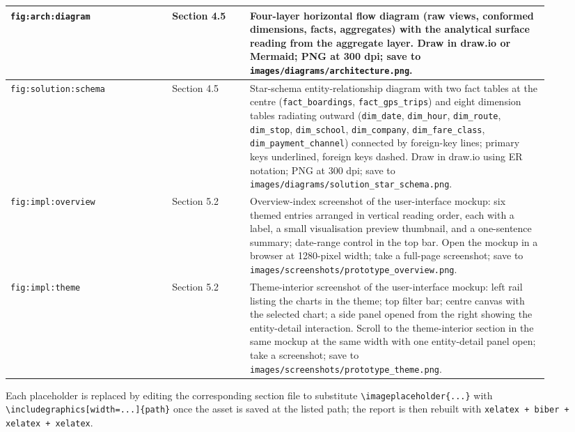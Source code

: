 \begin{longtable}{p{0.27\linewidth} p{0.13\linewidth} p{0.50\linewidth}}
\hline
\texttt{fig:arch:diagram} & Section 4.5 & Four-layer horizontal flow diagram (raw views, conformed dimensions, facts, aggregates) with the analytical surface reading from the aggregate layer. Draw in draw.io or Mermaid; PNG at 300 dpi; save to \texttt{images/diagrams/\linebreak architecture.png}. \\
\hline
\texttt{fig:solution:schema} & Section 4.5 & Star-schema entity-relationship diagram with two fact tables at the centre (\texttt{fact\_boardings}, \texttt{fact\_gps\_trips}) and eight dimension tables radiating outward (\texttt{dim\_date}, \texttt{dim\_hour}, \texttt{dim\_route}, \texttt{dim\_stop}, \texttt{dim\_school}, \texttt{dim\_company}, \texttt{dim\_fare\_class}, \texttt{dim\_payment\_channel}) connected by foreign-key lines; primary keys underlined, foreign keys dashed. Draw in draw.io using ER notation; PNG at 300 dpi; save to \texttt{images/diagrams/\linebreak solution\_star\_schema.png}. \\
\hline
\texttt{fig:impl:overview} & Section 5.2 & Overview-index screenshot of the user-interface mockup: six themed entries arranged in vertical reading order, each with a label, a small visualisation preview thumbnail, and a one-sentence summary; date-range control in the top bar. Open the mockup in a browser at 1280-pixel width; take a full-page screenshot; save to \texttt{images/screenshots/\linebreak prototype\_overview.png}. \\
\hline
\texttt{fig:impl:theme} & Section 5.2 & Theme-interior screenshot of the user-interface mockup: left rail listing the charts in the theme; top filter bar; centre canvas with the selected chart; a side panel opened from the right showing the entity-detail interaction. Scroll to the theme-interior section in the same mockup at the same width with one entity-detail panel open; take a screenshot; save to \texttt{images/screenshots/\linebreak prototype\_theme.png}. \\
\hline
\end{longtable}

Each placeholder is replaced by editing the corresponding section file to substitute \texttt{\textbackslash imageplaceholder\{...\}} with \texttt{\textbackslash includegraphics[width=...]\{path\}} once the asset is saved at the listed path; the report is then rebuilt with \texttt{xelatex + biber + xelatex + xelatex}.
